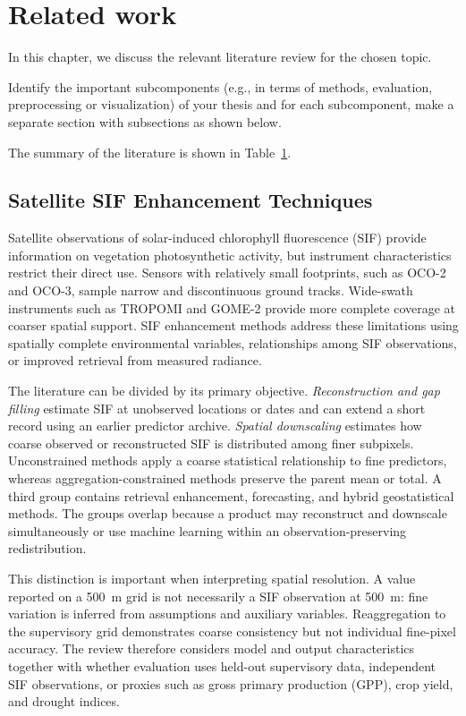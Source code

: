 \chapter{Related work\label{cha:chapter3}}

In this chapter, we discuss the relevant literature review for the chosen topic.

Identify the important subcomponents (e.g., in terms of methods, evaluation, preprocessing or visualization) of your thesis and for each subcomponent, make a separate section with subsections as shown below.

The summary of the literature is shown in Table~\ref{}.



\section{Satellite SIF Enhancement Techniques}
\label{sec:sif_enhancement}

Satellite observations of solar-induced chlorophyll fluorescence (SIF) provide information on vegetation photosynthetic activity, but instrument characteristics restrict their direct use. Sensors with relatively small footprints, such as OCO-2 and OCO-3, sample narrow and discontinuous ground tracks. Wide-swath instruments such as TROPOMI and GOME-2 provide more complete coverage at coarser spatial support. SIF enhancement methods address these limitations using spatially complete environmental variables, relationships among SIF observations, or improved retrieval from measured radiance.

The literature can be divided by its primary objective. \emph{Reconstruction and gap filling} estimate SIF at unobserved locations or dates and can extend a short record using an earlier predictor archive. \emph{Spatial downscaling} estimates how coarse observed or reconstructed SIF is distributed among finer subpixels. Unconstrained methods apply a coarse statistical relationship to fine predictors, whereas aggregation-constrained methods preserve the parent mean or total. A third group contains retrieval enhancement, forecasting, and hybrid geostatistical methods. The groups overlap because a product may reconstruct and downscale simultaneously or use machine learning within an observation-preserving redistribution.

This distinction is important when interpreting spatial resolution. A value reported on a 500~m grid is not necessarily a SIF observation at 500~m: fine variation is inferred from assumptions and auxiliary variables. Reaggregation to the supervisory grid demonstrates coarse consistency but not individual fine-pixel accuracy. The review therefore considers model and output characteristics together with whether evaluation uses held-out supervisory data, independent SIF observations, or proxies such as gross primary production (GPP), crop yield, and drought indices.

